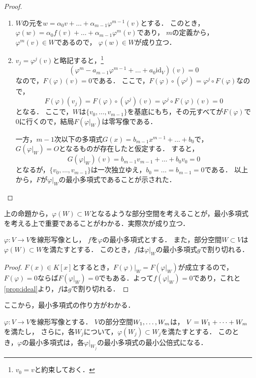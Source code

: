 \begin{proof}
    \begin{enumerate}
        \item $W$の元を$w = \alpha_0 v + \dots + \alpha_{m-1} \varphi^{m-1}(v)$とする．
        このとき，$\varphi(w) = \alpha_0 f(v) + \dots + \alpha_{m-1} \varphi^{m}(v)$であり，
        $m$の定義から，$\varphi^m(v) \in W$であるので，
        $\varphi(w) \in W$が成り立つ．
        \item $v_j = \varphi^j(v)$と略記すると，\footnote{$v_0 = v$と約束しておく．}
        \[
            (\varphi^m-a_{m-1}\varphi^{m-1} + \dots + a_0 \mathrm{id}_V)(v) = 0
        \]
        なので，$F(\varphi)(v)=0$である．
        ここで，$F(\varphi) \circ (\varphi^j) = \varphi^j \circ F(\varphi)$なので，
        \[
            F(\varphi)(v_j) = F(\varphi) \circ (\varphi^j)(v) = \varphi^j \circ F(\varphi)(v) = 0
        \]
        となる．
        ここで，$W$は$\{v_0,\dots,v_{m-1}\}$を基底にもち，その元すべてが$F(\varphi)$で0に行くので，結局$F(\varphi|_W)$は零写像である．

        一方，$m-1$次以下の多項式$G(x) = b_{m-1}x^{m-1} + \dots + b_0$で，
        $G(\varphi|_W)=O$となるものが存在したと仮定する．
        すると，
        \[
            G(\varphi|_W)(v) =  b_{m-1}v_{m-1} + \dots + b_0 v_0 = 0
        \]
        となるが，$\{v_0,\dots,v_{m-1}\}$は一次独立ゆえ，$b_0 = \dots = b_{m-1} = 0$である．
        以上から，$F$が$\varphi|_W$の最小多項式であることが示された．
    \end{enumerate}
\end{proof}
上の命題から，$\varphi(W) \subset W$となるような部分空間を考えることが，最小多項式を考える上で重要であることがわかる．実際次が成り立つ．
\begin{prop}\label{prop:stable_subspace}
    $\varphi \colon V \to V$を線形写像とし，
    $f$を$\varphi$の最小多項式とする．
    また，部分空間$W \subset V$は$\varphi(W)\subset W$を満たすとする．
    このとき，$f$は$\varphi|_W$の最小多項式$g$で割り切れる．
\end{prop}
\begin{proof}
    $F(x) \in K[x]$とするとき，$F(\varphi)|_W = F(\varphi|_W)$が成立するので，$F(\varphi)=0$ならば$F(\varphi|_W)=0$でもある．よって$f(\varphi|_W)=0$であり，これと\cref{prop:ideal}より，$f$は$g$で割り切れる．
\end{proof}
ここから，最小多項式の作り方がわかる．
\begin{prop}\label{prop:min_poly_lcm}
    $\varphi \colon V \to V$を線形写像とする．
    $V$の部分空間$\idxdot{W}{1}{m}$は，
    $V=\idxsum{W}{1}{m}{+}$を満たし，
    さらに，各$W_j$について，$\varphi(W_j) \subset W_j$を満たすとする．
    このとき，$\varphi$の最小多項式は，各$\varphi|_{W_j}$の最小多項式の最小公倍式になる．
\end{prop}
